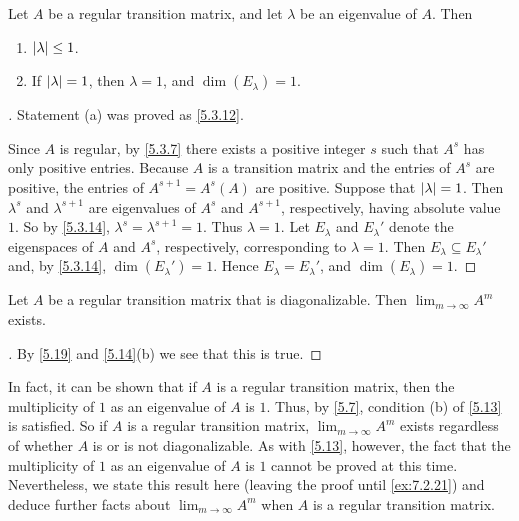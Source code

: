 \begin{thm}\label{5.19}
  Let \(A\) be a regular transition matrix, and let \(\lambda\) be an eigenvalue of \(A\).
  Then
  \begin{enumerate}
    \item \(\left\lvert\lambda\right\rvert \leq 1\).
    \item If \(\left\lvert\lambda\right\rvert = 1\), then \(\lambda = 1\), and \(\dim(E_{\lambda}) = 1\).
  \end{enumerate}
\end{thm}

\begin{proof}[]
  Statement (a) was proved as \cref{5.3.12}.

  Since \(A\) is regular, by \cref{5.3.7} there exists a positive integer \(s\) such that \(A^s\) has only positive entries.
  Because \(A\) is a transition matrix and the entries of \(A^s\) are positive, the entries of \(A^{s + 1} = A^s (A)\) are positive.
  Suppose that \(\left\lvert\lambda\right\rvert = 1\).
  Then \(\lambda^s\) and \(\lambda^{s + 1}\) are eigenvalues of \(A^s\) and \(A^{s + 1}\), respectively, having absolute value \(1\).
  So by \cref{5.3.14}, \(\lambda^s = \lambda^{s + 1} = 1\).
  Thus \(\lambda = 1\).
  Let \(E_{\lambda}\) and \(E_{\lambda}'\) denote the eigenspaces of \(A\) and \(A^s\), respectively, corresponding to \(\lambda = 1\).
  Then \(E_{\lambda} \subseteq E_{\lambda}'\) and, by \cref{5.3.14}, \(\dim(E_{\lambda}') = 1\).
  Hence \(E_{\lambda} = E_{\lambda}'\), and \(\dim(E_{\lambda}) = 1\).
\end{proof}

\begin{cor}\label{5.3.15}
  Let \(A\) be a regular transition matrix that is diagonalizable.
  Then \(\lim_{m \to \infty} A^m\) exists.
\end{cor}

\begin{proof}[]
  By \cref{5.19} and \cref{5.14}(b) we see that this is true.
\end{proof}

\begin{note}
  In fact, it can be shown that if \(A\) is a regular transition matrix, then the multiplicity of \(1\) as an eigenvalue of \(A\) is \(1\).
  Thus, by \cref{5.7}, condition (b) of \cref{5.13} is satisfied.
  So if \(A\) is a regular transition matrix, \(\lim_{m \to \infty} A^m\) exists regardless of whether \(A\) is or is not diagonalizable.
  As with \cref{5.13}, however, the fact that the multiplicity of \(1\) as an eigenvalue of \(A\) is \(1\) cannot be proved at this time.
  Nevertheless, we state this result here (leaving the proof until \cref{ex:7.2.21}) and deduce further facts about \(\lim_{m \to \infty} A^m\) when \(A\) is a regular transition matrix.
\end{note}

